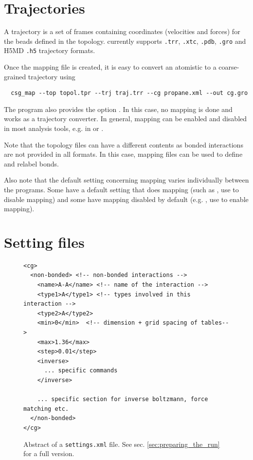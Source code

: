 \section{Trajectories}
\label{sec:trajectory}

A trajectory is a set of frames containing coordinates (velocities and forces) for the beads defined in the topology. \votca currently supports \texttt{.trr}, \texttt{.xtc}, \texttt{.pdb}, \texttt{.gro} and H5MD \texttt{.h5} trajectory formats.

Once the mapping file is created, it is easy to convert an atomistic to a coarse-grained trajectory using 
\begin{verbatim}
  csg_map --top topol.tpr --trj traj.trr --cg propane.xml --out cg.gro
\end{verbatim}

The program  also provides the option . In this case, no mapping is done and  works as a trajectory converter. In general, mapping can be enabled and disabled in most analysis tools, e.g. in  or .

Note that the topology files can have a different contents as bonded interactions are not provided in all formats. In this case, mapping files can be used to define and relabel bonds.

Also note that the default setting concerning mapping varies individually between the programs. Some have a default setting that does mapping (such as , use  to disable mapping) and some have mapping disabled by default (e.g. , use  to enable mapping).

\section{Setting files}
\label{sec:setting_files}

\begin{figure}[h]
\centering
\begin{lstlisting}[frame=single]
<cg>
  <non-bonded> <!-- non-bonded interactions -->
    <name>A-A</name> <!-- name of the interaction -->
    <type1>A</type1> <!-- types involved in this interaction -->
    <type2>A</type2>
    <min>0</min>  <!-- dimension + grid spacing of tables-->
    <max>1.36</max>
    <step>0.01</step>
    <inverse>
      ... specific commands
    </inverse>

    ... specific section for inverse boltzmann, force matching etc.
  </non-bonded>
</cg>
\end{lstlisting}
\caption{Abstract of a \texttt{settings.xml} file. See sec. \ref{sec:preparing_the_run} for a full version.}
\end{figure}

